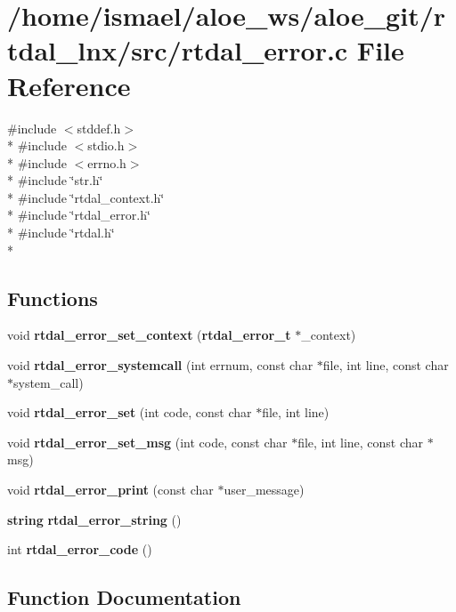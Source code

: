 \section{/home/ismael/aloe\-\_\-ws/aloe\-\_\-git/rtdal\-\_\-lnx/src/rtdal\-\_\-error.c File Reference}
\label{rtdal__error_8c}
{\ttfamily \#include $<$stddef.\-h$>$}\\*
{\ttfamily \#include $<$stdio.\-h$>$}\\*
{\ttfamily \#include $<$errno.\-h$>$}\\*
{\ttfamily \#include \char`\"{}str.\-h\char`\"{}}\\*
{\ttfamily \#include \char`\"{}rtdal\-\_\-context.\-h\char`\"{}}\\*
{\ttfamily \#include \char`\"{}rtdal\-\_\-error.\-h\char`\"{}}\\*
{\ttfamily \#include \char`\"{}rtdal.\-h\char`\"{}}\\*
\subsection*{Functions}
\begin{DoxyCompactItemize}
\item 
void {\bf rtdal\-\_\-error\-\_\-set\-\_\-context} ({\bf rtdal\-\_\-error\-\_\-t} $\ast$\-\_\-context)
\item 
void {\bf rtdal\-\_\-error\-\_\-systemcall} (int errnum, const char $\ast$file, int line, const char $\ast$system\-\_\-call)
\item 
void {\bf rtdal\-\_\-error\-\_\-set} (int code, const char $\ast$file, int line)
\item 
void {\bf rtdal\-\_\-error\-\_\-set\-\_\-msg} (int code, const char $\ast$file, int line, const char $\ast$msg)
\item 
void {\bf rtdal\-\_\-error\-\_\-print} (const char $\ast$user\-\_\-message)
\item 
{\bf string} {\bf rtdal\-\_\-error\-\_\-string} ()
\item 
int {\bf rtdal\-\_\-error\-\_\-code} ()
\end{DoxyCompactItemize}


\subsection{Function Documentation}
